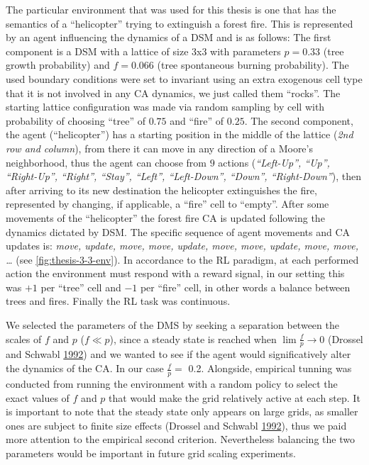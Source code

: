 \documentclass[
  openany]{book}
\begin{document}
The particular environment that was used for this thesis is one that has the semantics of a ``helicopter'' trying to extinguish a forest fire. This is represented by an agent influencing the dynamics of a DSM and is as follows: The first component is a DSM with a lattice of size 3x3 with parameters \(p=0.33\) (tree growth probability) and \(f=0.066\) (tree spontaneous burning probability). The used boundary conditions were set to invariant using an extra exogenous cell type that it is not involved in any CA dynamics, we just called them ``rocks''. The starting lattice configuration was made via random sampling by cell with probability of choosing ``tree'' of \(0.75\) and ``fire'' of \(0.25\). The second component, the agent (``helicopter'') has a starting position in the middle of the lattice (\emph{2nd row and column}), from there it can move in any direction of a Moore's neighborhood, thus the agent can choose from \(9\) actions (\emph{``Left-Up'', ``Up'', ``Right-Up'', ``Right'', ``Stay'', ``Left'', ``Left-Down'', ``Down'', ``Right-Down''}), then after arriving to its new destination the helicopter extinguishes the fire, represented by changing, if applicable, a ``fire'' cell to ``empty''. After some movements of the ``helicopter'' the forest fire CA is updated following the dynamics dictated by DSM. The specific sequence of agent movements and CA updates is: \emph{move, update, move, move, update, move, move, update, move, move, \ldots{}} (see \ref{fig:thesis-3-3-env}). In accordance to the RL paradigm, at each performed action the environment must respond with a reward signal, in our setting this was \(+1\) per ``tree'' cell and \(-1\) per ``fire'' cell, in other words a balance between trees and fires. Finally the RL task was continuous.

We selected the parameters of the DMS by seeking a separation between the scales of \(f\) and \(p\) (\(f \ll p\)), since a steady state is reached when \(\lim \frac {f}{p} \to 0\) (Drossel and Schwabl \protect\hyperlink{ref-drossel1992self}{1992}) and we wanted to see if the agent would significatively alter the dynamics of the CA. In our case \(\frac {f}{p}=\) 0.2. Alongside, empirical tunning was conducted from running the environment with a random policy to select the exact values of \(f\) and \(p\) that would make the grid relatively active at each step. It is important to note that the steady state only appears on large grids, as smaller ones are subject to finite size effects (Drossel and Schwabl \protect\hyperlink{ref-drossel1992self}{1992}), thus we paid more attention to the empirical second criterion. Nevertheless balancing the two parameters would be important in future grid scaling experiments.
\end{document}
